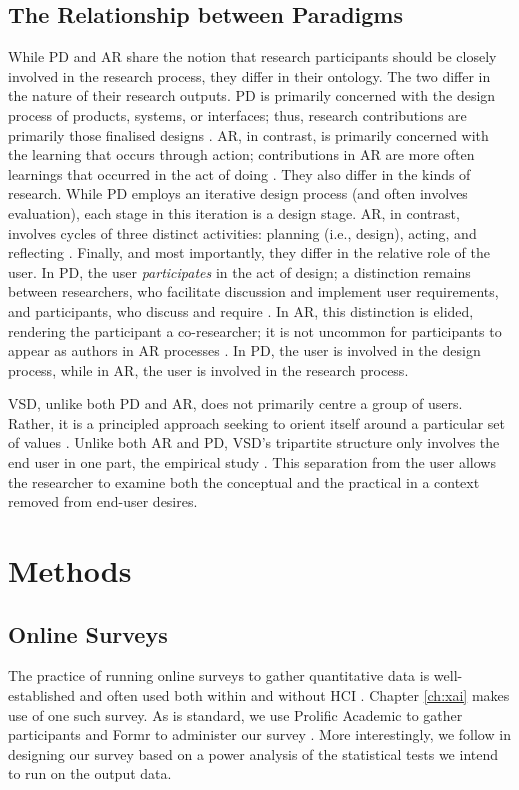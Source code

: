 \subsection{The Relationship between Paradigms}
While PD and AR share the notion that research participants should be closely involved in the research process, they differ in their ontology. The two differ in the nature of their research outputs. PD is primarily concerned with the design process of products, systems, or interfaces; thus, research contributions are primarily those finalised designs \cite{zimmerman_research_2014}. AR, in contrast, is primarily concerned with the learning that occurs through action; contributions in AR are more often learnings that occurred in the act of doing \cite{Hult1980TOWARDSAD}. They also differ in the kinds of research. While PD employs an iterative design process (and often involves evaluation), each stage in this iteration is a design stage. AR, in contrast, involves cycles of three distinct activities: planning (i.e., design), acting, and reflecting \cite{Hult1980TOWARDSAD}. Finally, and most importantly, they differ in the relative role of the user. In PD, the user \emph{participates} in the act of design; a distinction remains between researchers, who facilitate discussion and implement user requirements, and participants, who discuss and require \cite{Hussain2014OverviewOV}. In AR, this distinction is elided, rendering the participant a co-researcher; it is not uncommon for participants to appear as authors in AR processes \cite{Hayes_2011}. In PD, the user is involved in the design process, while in AR, the user is involved in the research process.

VSD, unlike both PD and AR, does not primarily centre a group of users. Rather, it is a principled approach seeking to orient itself around a particular set of values \cite{10.1145/242485.242493}. Unlike both AR and PD, VSD's tripartite structure only involves the end user in one part, the empirical study \cite{10.1145/242485.242493}. This separation from the user allows the researcher to examine both the conceptual and the practical in a context removed from end-user desires.

\section{Methods} %
\subsection{Online Surveys}
The practice of running online surveys to gather quantitative data is well-established and often used both within and without HCI \cite{zhao2023fairness,pillai_adoption_2020,krishna_disagreement_2022,mai_user_nodate,bansal_does_2021,binns_its_2018,dzindolet_role_2003,papenmeier_its_2022}. Chapter \ref{ch:xai} makes use of one such survey. As is standard, we use Prolific Academic to gather participants and Formr to administer our survey \cite{binns_its_2018,Arslan_formr_2019}. More interestingly, we follow \textcite{caldwell_power_nodate} in designing our survey based on a power analysis of the statistical tests we intend to run on the output data.

